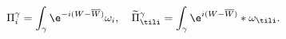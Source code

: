 \begin{equation}
\Pi_i^{\gamma}
=\int_{\gamma}\e^{-i(W-\overline{W})}\omega_i,\quad
\widetilde{\Pi}_{\tili}^{\gamma}
=\int_{\gamma}\e^{i(W-\overline{W})}*\omega_{\tili}.
\label{piexx}
\end{equation}

